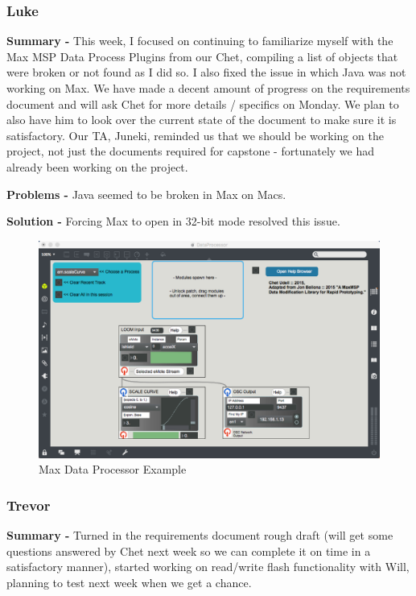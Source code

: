 \documentclass[onecolumn, draftclsnofoot,10pt, compsoc]{IEEEtran}
\begin{document}
\subsubsection*{Luke}
    \begin{adjustwidth}{2.5em}{0pt}
    \textbf{Summary -} This week, I focused on continuing to familiarize myself with the Max MSP Data Process Plugins from our Chet, compiling a list of objects that were broken or not found as I did so. I also fixed the issue in which Java was not working on Max. We have made a decent amount of progress on the requirements document and will ask Chet for more details / specifics on Monday. We plan to also have him to look over the current state of the document to make sure it is satisfactory. Our TA, Juneki, reminded us that we should be working on the project, not just the documents required for capstone - fortunately we had already been working on the project.
    
    \textbf{Problems -} Java seemed to be broken in Max on Macs.
    \end{adjustwidth} 
    \begin{adjustwidth}{5em}{0pt}
    \textbf{Solution -} Forcing Max to open in 32-bit mode resolved this issue.
    \end{adjustwidth} 

    \begin{figure}[H]
        \centering
        \caption{Max Data Processor Example}
        \label{fig:max_example_interface}
        \includegraphics[width=.8\linewidth]{max_example_interface.eps}         
    \end{figure}


\subsubsection*{Trevor}
    \begin{adjustwidth}{2.5em}{0pt}
    \textbf{Summary -} Turned in the requirements document rough draft (will get some questions answered by Chet next week so we can complete it on time in a satisfactory manner), started working on read/write flash functionality with Will, planning to test   next week when we get a chance.
    \end{adjustwidth}
\end{document}
